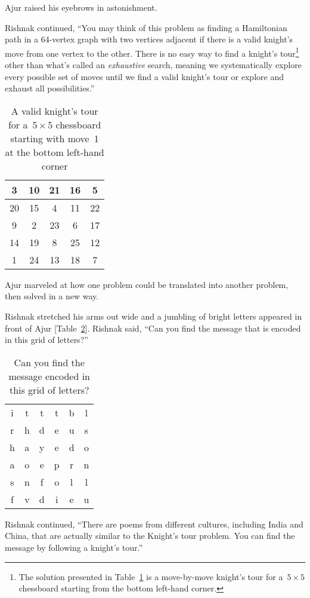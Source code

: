 Ajur raised his eyebrows in astonishment.

Rishnak continued, ``You may think of this problem as finding a Hamiltonian path in a 64-vertex graph with two vertices adjacent if there is a valid knight's move from one vertex to the other. There is no easy way to find a knight's tour\footnote{The solution presented in Table~\ref{5t1} is a move-by-move knight's tour for a~$5\times5$ chessboard starting from the bottom left-hand corner.}  other than what's called an \textit{exhaustive} search, meaning we systematically explore every possible set of moves until we find a valid knight's tour or explore and exhaust all possibilities.''

\begin{table}
\centering
\begin{tabular}{|c |c |c| c| c|} 
 \hline
3&10&21&16& 5\\
\hline
20&15& 4&11&22\\
\hline
 9& 2&23& 6&17\\
 \hline
14&19& 8&25&12\\
\hline
 1&24&13&18& 7\\
 \hline
\end{tabular}
\caption{A valid knight's tour for a~$5\times5$ chessboard starting with move~1 at the bottom left-hand corner}
\label{5t1}
\end{table}

Ajur marveled at how one problem could be translated into another problem, then solved in a new way.

Rishnak stretched his arms out wide and a jumbling of bright letters appeared in front of Ajur [Table~\ref{5t2}]. Rishnak said, ``Can you find the message that is encoded in this grid of letters?''

\begin{table}
\centering
\begin{tabular}{c c c c cc}
i& t& t& t& b& l\\
r& h &d &e& u& s\\
h& a& y& e& d& o\\
a& o& e& p& r& n\\
s& n& f& o& l& l\\
f& v& d &i& e& u\\
\end{tabular}
\caption{Can you find the message encoded in this grid of letters?}
\label{5t2}
\end{table}

Rishnak continued, ``There are poems from different cultures, including India and China, that are actually similar to the Knight's tour problem. You can find the message by following a knight's tour.''

